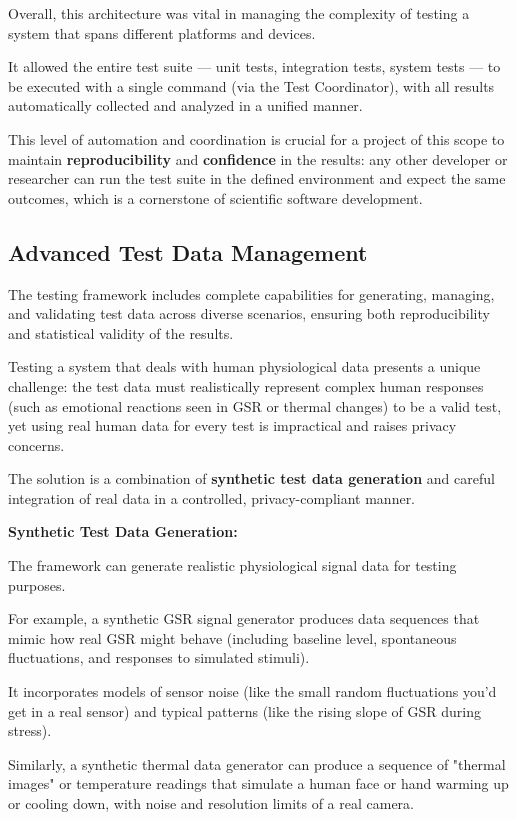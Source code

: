 {{Overall, this architecture was vital in managing the complexity of testing a system
that spans different platforms and devices.

It allowed the entire test suite --- unit tests, integration tests, system tests ---
to be executed with a single command (via the Test Coordinator), with all results
automatically collected and analyzed in a unified manner.

This level of automation and coordination is crucial for a project of this scope to
maintain \textbf{reproducibility}
 and \textbf{confidence}
 in the results: any other developer or researcher can run the test suite in the
 defined environment and expect the same outcomes, which is a cornerstone of
 scientific software development.

\subsection{Advanced Test Data Management}

The testing framework includes complete capabilities for generating, managing, and
validating test data across diverse scenarios, ensuring both reproducibility and
statistical validity of the results.

Testing a system that deals with human physiological data presents a unique
challenge: the test data must realistically represent complex human responses (such
as emotional reactions seen in GSR or thermal changes) to be a valid test, yet using
real human data for every test is impractical and raises privacy concerns.

The solution is a combination of \textbf{synthetic test data generation}
 and careful integration of real data in a controlled, privacy-compliant manner.

\textbf{Synthetic Test Data Generation:}

The framework can generate realistic physiological signal data for testing purposes.

For example, a synthetic GSR signal generator produces data sequences that mimic how
real GSR might behave (including baseline level, spontaneous fluctuations, and
responses to simulated stimuli).

It incorporates models of sensor noise (like the small random fluctuations you'd get
in a real sensor) and typical patterns (like the rising slope of GSR during stress).

Similarly, a synthetic thermal data generator can produce a sequence of "thermal
images" or temperature readings that simulate a human face or hand warming up or
cooling down, with noise and resolution limits of a real camera.

}}
